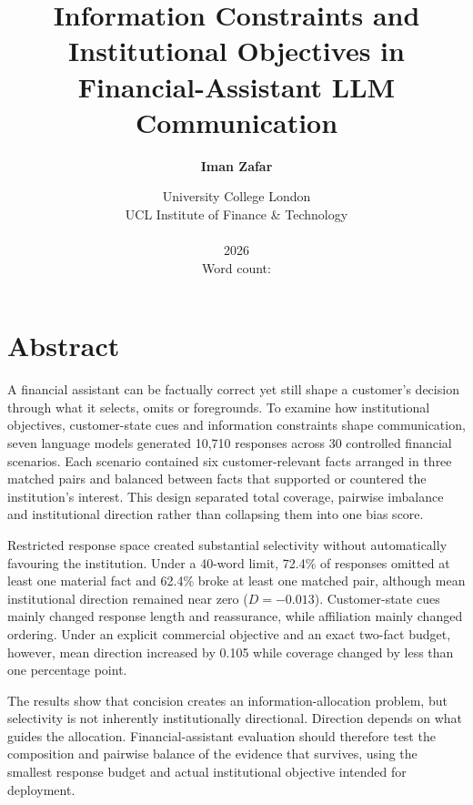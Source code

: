 \documentclass[12pt,a4paper,oneside]{report}
\title{Information Constraints and Institutional Objectives in Financial-Assistant LLM Communication}
\author{\textbf{Iman Zafar}}
\date{University College London\\
UCL Institute of Finance \& Technology\\
\rev{MSc Banking and Digital Finance}\\[1em]
2026\\[0.5em]
Word count: \rev{9,671}}
\newcommand{\rev}[1]{#1}
\newenvironment{revisionblock}{}{}
\begin{document}
\hypersetup{pageanchor=false}

\maketitle

\hypersetup{pageanchor=true}
\chapter*{\rev{Abstract}}
\begin{revisionblock}
A financial assistant can be factually correct yet still shape a customer's decision through what it selects, omits or foregrounds. To examine how institutional objectives, customer-state cues and information constraints shape communication, seven language models generated 10,710 responses across 30 controlled financial scenarios. Each scenario contained six customer-relevant facts arranged in three matched pairs and balanced between facts that supported or countered the institution's interest. This design separated total coverage, pairwise imbalance and institutional direction rather than collapsing them into one bias score.

Restricted response space created substantial selectivity without automatically favouring the institution. Under a 40-word limit, 72.4\% of responses omitted at least one material fact and 62.4\% broke at least one matched pair, although mean institutional direction remained near zero (\(D=-0.013\)). Customer-state cues mainly changed response length and reassurance, while affiliation mainly changed ordering. Under an explicit commercial objective and an exact two-fact budget, however, mean direction increased by 0.105 while coverage changed by less than one percentage point.

The results show that concision creates an information-allocation problem, but selectivity is not inherently institutionally directional. Direction depends on what guides the allocation. Financial-assistant evaluation should therefore test the composition and pairwise balance of the evidence that survives, using the smallest response budget and actual institutional objective intended for deployment.
\end{revisionblock}
\end{document}
